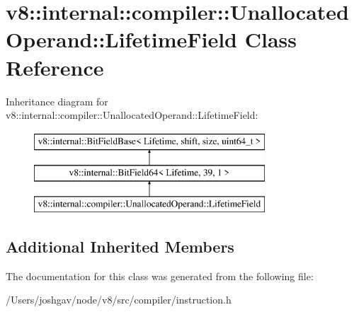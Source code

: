 \hypertarget{classv8_1_1internal_1_1compiler_1_1_unallocated_operand_1_1_lifetime_field}{}\section{v8\+:\+:internal\+:\+:compiler\+:\+:Unallocated\+Operand\+:\+:Lifetime\+Field Class Reference}
\label{classv8_1_1internal_1_1compiler_1_1_unallocated_operand_1_1_lifetime_field}
Inheritance diagram for v8\+:\+:internal\+:\+:compiler\+:\+:Unallocated\+Operand\+:\+:Lifetime\+Field\+:\begin{figure}[H]
\begin{center}
\leavevmode
\includegraphics[height=3.000000cm]{classv8_1_1internal_1_1compiler_1_1_unallocated_operand_1_1_lifetime_field}
\end{center}
\end{figure}
\subsection*{Additional Inherited Members}


The documentation for this class was generated from the following file\+:\begin{DoxyCompactItemize}
\item 
/\+Users/joshgav/node/v8/src/compiler/instruction.\+h\end{DoxyCompactItemize}
